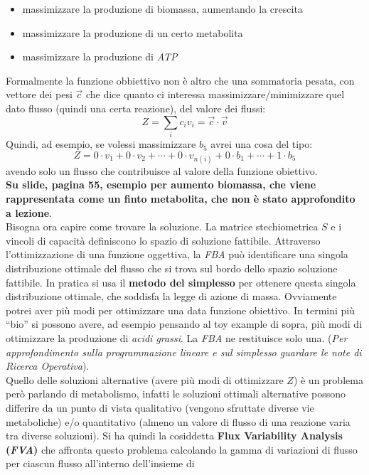 \documentclass[a4paper,12pt, oneside]{book}
\begin{document}
\begin{itemize}
  \item massimizzare la produzione di biomassa, aumentando la crescita
  \item massimizzare la produzione di un certo metabolita
  \item massimizzare la produzione di \textit{ATP}
\end{itemize}
Formalmente la funzione obbiettivo non è altro che una sommatoria pesata, con
vettore dei pesi $\vec{c}$ che dice quanto ci interessa massimizzare/minimizzare
quel dato flusso (quindi una certa reazione), del
valore dei flussi:
\[Z=\sum_i c_iv_i=\vec{c}\cdot \vec{v}\]
Quindi, ad esempio, se volessi massimizzare $b_5$ avrei una cosa del tipo:
\[Z=0\cdot v_1+0\cdot v_2+\cdots+0\cdot v_{n(i)}+0\cdot b_1+\cdots+1\cdot b_5\]
avendo solo un flusso che contribuisce al valore della funzione obiettivo.\\
\textbf{Su slide, pagina 55, esempio per aumento biomassa, che viene
  rappresentata come un finto metabolita, che non è stato
  approfondito a lezione}.\\
Bisogna ora capire come trovare la soluzione. La matrice stechiometrica $S$ e i
vincoli di capacità definiscono lo spazio di soluzione fattibile. Attraverso
l'ottimizzazione di una funzione oggettiva, la \textit{FBA} può identificare una
singola distribuzione ottimale del flusso che si trova sul bordo dello spazio
soluzione fattibile. In pratica si usa il \textbf{metodo del simplesso} per
ottenere questa singola distribuzione ottimale, che soddisfa la legge di azione
di massa. Ovviamente potrei aver più modi per ottimizzare una data funzione
obiettivo. In termini più ``bio'' si possono avere, ad esempio pensando al toy
example di sopra, più modi di ottimizzare la produzione di \textit{acidi
  grassi}. La \textit{FBA} ne restituisce solo una.
(\textit{Per approfondimento sulla programmazione lineare e sul simplesso
  guardare le note di Ricerca Operativa}). \\
Quello delle soluzioni alternative (avere più modi di ottimizzare $Z$) è un
problema però parlando di metabolismo, infatti le soluzioni ottimali alternative
possono differire da un punto di vista qualitativo (vengono sfruttate diverse
vie metaboliche) e/o quantitativo (almeno un valore di flusso di una reazione
varia tra diverse soluzioni). Si ha quindi la cosiddetta \textbf{Flux
  Variability Analysis (\textit{FVA})} che affronta questo problema calcolando
la gamma di variazioni di flusso per ciascun flusso all'interno dell'insieme di
\end{document}
